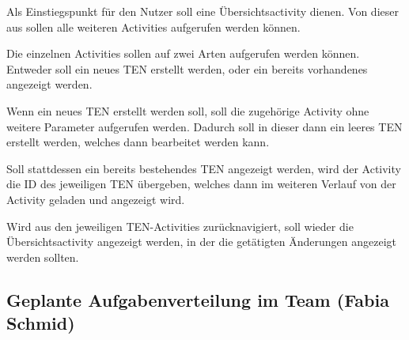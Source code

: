 Als Einstiegspunkt für den Nutzer soll eine Übersichtsactivity dienen. Von dieser aus sollen alle weiteren Activities aufgerufen werden können.

Die einzelnen Activities sollen auf zwei Arten aufgerufen werden können. Entweder soll ein neues TEN erstellt werden, oder ein bereits vorhandenes angezeigt werden.

Wenn ein neues TEN erstellt werden soll, soll die zugehörige Activity ohne weitere Parameter aufgerufen werden. Dadurch soll in dieser dann ein leeres TEN erstellt werden, welches dann bearbeitet werden kann.

Soll stattdessen ein bereits bestehendes TEN angezeigt werden, wird der Activity die ID des jeweiligen TEN übergeben, welches dann im weiteren Verlauf von der Activity geladen und angezeigt wird.

Wird aus den jeweiligen TEN-Activities zurücknavigiert, soll wieder die Übersichtsactivity angezeigt werden, in der die getätigten Änderungen angezeigt werden sollten.

\newpage
\subsection{Geplante Aufgabenverteilung im Team (Fabia Schmid)}

